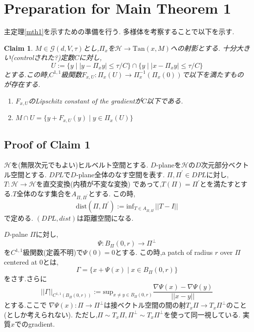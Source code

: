 \documentclass{jarticle}
\newtheorem{clm}{Claim}
\newcommand{\bpd}{B_{\Pi}(0,r)}
\newcommand{\gnd}{||\Gamma||_{C^{1,1}(\bpd)}}
\newcommand{\gdvt}{\mathcal{G}(d,V,\tau)}
\begin{document}
\section{Preparation for Main Theorem 1}
\label{Preparation for Main Theorem 1}
主定理\ref{mth1}を示すための準備を行う.
多様体を考察することで以下を示す.
\begin{clm}
  $M \in \gdvt$とし,$\Pi_x$を$\mathcal{H} \to \mathrm{Tan}(x,M)$への射影とする.
  十分大きい(controlされた?)定数$C$に対し,
  \begin{equation*}
   U:= \{ y \mid |y - \Pi_xy| \le \tau/C \} \cap \{ y \mid |x - \Pi_x y| \le \tau/C \}
  \end{equation*}
  とする.この時,$C^{1,1}$級関数$F_{x,U}:\Pi_x(U) \to \Pi_x^{-1}(\Pi_x(0))$で以下を満たすものが存在する.
  \begin{enumerate}
    \item $F_{x,U}$のLipschitz constant of the gradientが$C$以下である.
    \item $ \displaystyle
    M \cap U = \{ y + F_{x,U}(y) \mid y \in \Pi_x(U) \} $
  \end{enumerate}
\end{clm}

\subsection{Proof of Claim 1}
\label{sec:Proof of CLAIM 1}

$\mathcal{H}$を(無限次元でもよい)ヒルベルト空間とする.
$D$-planeを$\mathcal{H}$の$D$次元部分ベクトル空間とする.
$DPL$で$D$-plane全体のなす空間を表す.
$\Pi,\Pi^\prime \in DPL$に対し,$T: \mathcal{H} \to \mathcal{H}$を直交変換(内積が不変な変換)
であって,$T(\Pi)= \Pi^\prime$とを満たすとする.$T$全体のなす集合を$A_{\Pi,\Pi^\prime}$とする.
この時,
\begin{equation*}
 \mathrm{dist} (\Pi,\Pi^\prime):= \mathrm{inf}_{T \in A_{\Pi,\Pi^\prime}} ||T -I||
\end{equation*}
で定める.
$(DPL,dist)$は距離空間になる.

$D$-palne $\Pi$に対し,
\begin{equation*}
 \Psi :\bpd \to \Pi^{\perp}
\end{equation*}
を$C^{1,1}$級関数(定義不明)で$\Psi(0)=0$とする.
この時,a patch of radius $r$ over $\Pi$ centered at 0とは,
\begin{equation*}
 \Gamma=\{ x + \Psi(x) \mid x \in \bpd \}
\end{equation*}
をさす.さらに
\begin{equation*}
 \gnd := \mathrm{sup}_{x \neq y \in \bpd} \frac{ \nabla \Psi(x) - \nabla \Psi(y)}{||x - y||}
\end{equation*}
とする.ここで
$\nabla\Psi(x):\Pi \to \Pi^{\perp}$は接ベクトル空間の間の射$T_x\Pi \to T_x\Pi^{\perp}$のこと(としか考えられない).
ただし,$\Pi \sim T_x \Pi, \Pi^{\perp} \sim T_x\Pi^{\perp}$を使って同一視している.
実質$x$でのgradient.
\end{document}
